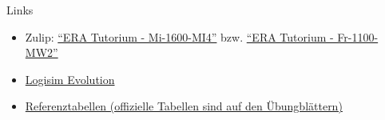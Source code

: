 \documentclass[
  german,            %
  aspectratio=169,    %
]{tumbeamer}
\begin{document}
\begin{frame}[fragile, c]{Links}{}
  \begin{itemize}
    \item Zulip: \href{https://zulip.in.tum.de/#narrow/stream/1917-ERA-Tutorium---Mi-1600-MI4}{\enquote{ERA Tutorium - Mi-1600-MI4}}
    bzw. \href{https://zulip.in.tum.de/#narrow/stream/1940-ERA-Tutorium---Fr-1100-MW2}{\enquote{ERA Tutorium - Fr-1100-MW2}}
    \item \href{https://github.com/logisim-evolution/logisim-evolution/releases}{Logisim Evolution}
    \item \href{https://courses.edx.org/assets/courseware/v1/f06a2dc0c856f60ec0711e9f5e1c98cf/asset-v1:HarveyMuddX+ENGR85B+1T2023+type@asset+block/FinalReferences.pdf}{Referenztabellen (offizielle Tabellen sind auf den Übungblättern)}
  \end{itemize}
\end{frame}

\maketitle
\end{document}
